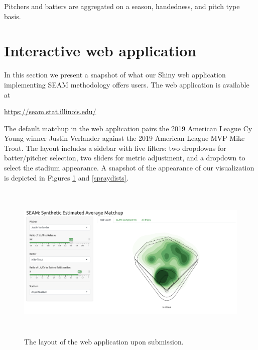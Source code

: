\documentclass[12pt]{article}
\begin{document}
Pitchers and batters are aggregated on a season, handedness, and pitch type basis. %





\section{Interactive web application}

In this section we present a snapshot of what our Shiny web application implementing SEAM methodology offers users. The web application is available at 
\begin{center}
\url{https://seam.stat.illinois.edu/} 
\end{center}
The default matchup in the web application pairs the 2019 American League Cy Young winner Justin Verlander against the 2019 American League MVP Mike Trout. The layout includes a sidebar with five filters: two dropdowns for batter/pitcher selection, two sliders for metric adjustment, and a dropdown to select the stadium appearance. A snapshot of the appearance of our visualization is depicted in Figures \ref{layout} and \ref{spraydists}.


\begin{figure}
\centering
    \includegraphics[width=5.5in, height=3in]{nFig1_layout.png}
    \caption{The layout of the web application upon submission.}
    \label{layout}
\end{figure}
\end{document}
